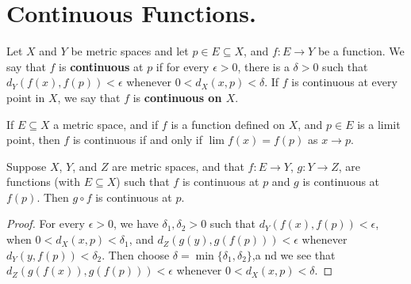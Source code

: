 
\section{Continuous Functions.}

\begin{definition}
    Let $X$ and  $Y$ be metric spaces and let  $p \in E \subseteq X$, and  $f:E \rightarrow Y$ be a
    function. We say that $f$ is \textbf{continuous} at $p$ if for every  $\epsilon>0$, there is a
    $\delta>0$ such that  $d_Y(f(x),f(p))<\epsilon$ whenever $0<d_X(x,p)<\delta$. If  $f$ is continuous
    at every point in  $X$, we say that  $f$ is \textbf{continuous on $X$}.
\end{definition}

\begin{theorem}\label{5.2.1}
    If $E \subseteq X$ a metric space, and if  $f$ is a function defined on $X$,  and  $p \in E$
    is a limit point, then  $f$ is continuous if and only if  $\lim{f(x)}=f(p)$ as  $x \rightarrow p$.
\end{theorem}

\begin{theorem}\label{5.2.2}
    Suppose $X$, $Y$, and  $Z$ are metric spaces, and that  $f:E \rightarrow Y$,  $g:Y \rightarrow Z$, are
    functions  (with $E \subseteq X$) such that $f$ is continuous at  $p$ and  $g$ is
    continuous at  $f(p)$. Then  $g \circ f$ is continuous at  $p$.
\end{theorem}
\begin{proof}
    For every $\epsilon>0$, we have  $\delta_1,\delta_2>0$ such that $d_Y(f(x),f(p))<\epsilon$, when
    $0<d_X(x,p)<\delta_1$, and  $d_Z(g(y),g(f(p)))<\epsilon$ whenever  $d_Y(y,f(p))<\delta_2$. Then
    choose  $\delta=\min\{\delta_1,\delta_2\}$,a nd we see that  $d_Z(g(f(x)),g(f(p)))<\epsilon$ whenever
    $0<d_X(x,p)<\delta$.
\end{proof}

